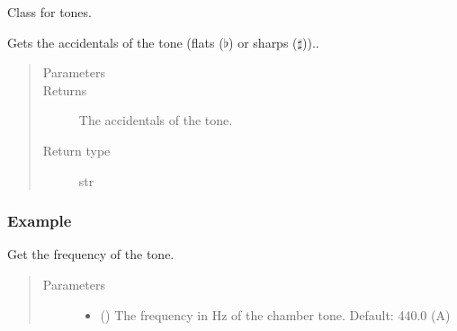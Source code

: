 \documentclass[letterpaper,10pt,english]{sphinxmanual}
\begin{document}
\begin{fulllineitems}
\sphinxAtStartPar
Class for tones.


\begin{fulllineitems}
\sphinxAtStartPar
Gets the accidentals of the tone (flats (\(\flat\)) or sharps (\(\sharp\)))..
\begin{quote}\begin{description}
\item[{Parameters}] \leavevmode
\sphinxAtStartPar
{} \textendash{} 

\item[{Returns}] \leavevmode
\sphinxAtStartPar
The accidentals of the tone.

\item[{Return type}] \leavevmode
\sphinxAtStartPar
str

\end{description}\end{quote}
\subsubsection*{Example}

\begin{sphinxVerbatim}[commandchars=\\\{\}]
   
\end{sphinxVerbatim}

\end{fulllineitems}



\begin{fulllineitems}
\sphinxAtStartPar
Get the frequency of the tone.
\begin{quote}\begin{description}
\item[{Parameters}] \leavevmode\begin{itemize}
\item {} 
\sphinxAtStartPar
{} () \textendash{} The frequency in Hz of the chamber tone. Default: 440.0 (A)


\end{itemize}
\end{description}
\end{quote}
\end{fulllineitems}
\end{fulllineitems}
\end{document}
